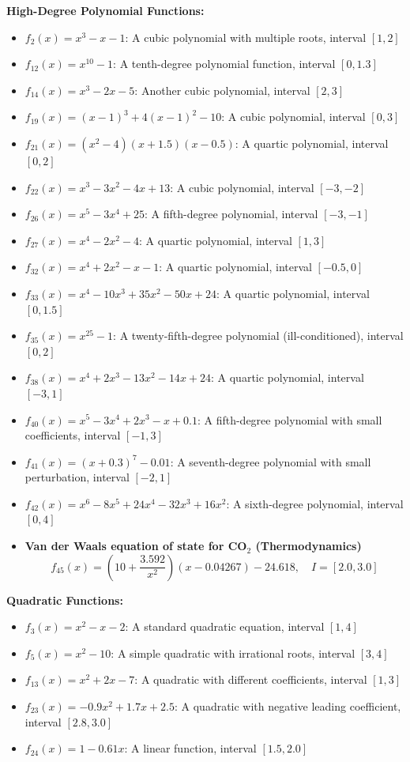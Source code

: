 \documentclass[amsmath, amssymb, aps]{revtex4-2}
\begin{document}
\textbf{High-Degree Polynomial Functions:}
\begin{itemize}
\item $f_2(x) = x^3 - x - 1$: A cubic polynomial with multiple roots, interval $[1, 2]$
\item $f_{12}(x) = x^{10} - 1$: A tenth-degree polynomial function, interval $[0, 1.3]$
\item $f_{14}(x) = x^3 - 2x - 5$: Another cubic polynomial, interval $[2, 3]$
\item $f_{19}(x) = (x - 1)^3 + 4(x - 1)^2 - 10$: A cubic polynomial, interval $[0, 3]$
\item $f_{21}(x) = (x^2 - 4)(x + 1.5)(x - 0.5)$: A quartic polynomial, interval $[0, 2]$
\item $f_{22}(x) = x^3 - 3x^2 - 4x + 13$: A cubic polynomial, interval $[-3, -2]$
\item $f_{26}(x) = x^5 - 3x^4 + 25$: A fifth-degree polynomial, interval $[-3, -1]$
\item $f_{27}(x) = x^4 - 2x^2 - 4$: A quartic polynomial, interval $[1, 3]$
\item $f_{32}(x) = x^4 + 2x^2 - x - 1$: A quartic polynomial, interval $[-0.5, 0]$
\item $f_{33}(x) = x^4 - 10x^3 + 35x^2 - 50x + 24$: A quartic polynomial, interval $[0, 1.5]$
\item $f_{35}(x) = x^{25} - 1$: A twenty-fifth-degree polynomial (ill-conditioned), interval $[0, 2]$
\item $f_{38}(x) = x^4 + 2x^3 - 13x^2 - 14x + 24$: A quartic polynomial, interval $[-3, 1]$
\item $f_{40}(x) = x^5 - 3x^4 + 2x^3 - x + 0.1$: A fifth-degree polynomial with small coefficients, interval $[-1, 3]$
\item $f_{41}(x) = (x + 0.3)^7 - 0.01$: A seventh-degree polynomial with small perturbation, interval $[-2, 1]$
\item $f_{42}(x) = x^6 - 8x^5 + 24x^4 - 32x^3 + 16x^2$: A sixth-degree polynomial, interval $[0, 4]$
\item \textbf{Van der Waals equation of state for CO$_2$ (Thermodynamics)} \[ f_{45}(x) = \left(10 + \frac{3.592}{x^2}\right)(x - 0.04267) - 24.618, \quad I = [2.0, 3.0] \]
\end{itemize}

\textbf{Quadratic Functions:}
\begin{itemize}
\item $f_3(x) = x^2 - x - 2$: A standard quadratic equation, interval $[1, 4]$
\item $f_5(x) = x^2 - 10$: A simple quadratic with irrational roots, interval $[3, 4]$
\item $f_{13}(x) = x^2 + 2x - 7$: A quadratic with different coefficients, interval $[1, 3]$
\item $f_{23}(x) = -0.9x^2 + 1.7x + 2.5$: A quadratic with negative leading coefficient, interval $[2.8, 3.0]$
\item $f_{24}(x) = 1 - 0.61x$: A linear function, interval $[1.5, 2.0]$
\end{itemize}
\end{document}
